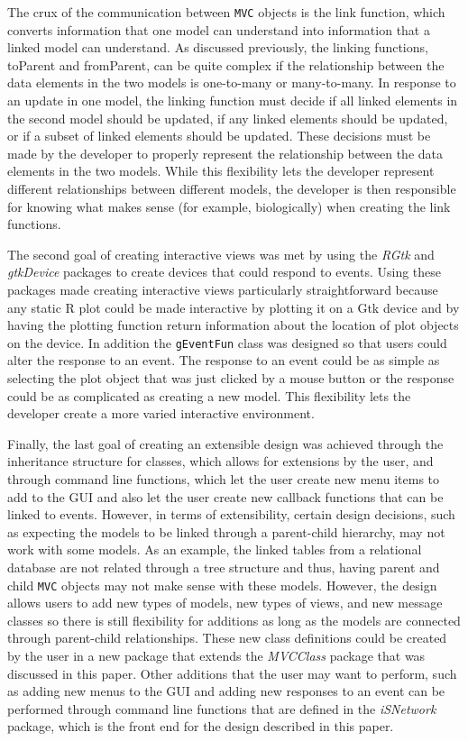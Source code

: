 \documentclass{article}[11pt]
\newcommand{\Rfunction}[1]{{\textsf{#1}}}
\newcommand{\Robject}[1]{{\texttt{#1}}}
\newcommand{\Rpackage}[1]{{\textit{#1}}}
\newcommand{\Rclass}[1]{\texttt{#1}}
\begin{document}
The crux of the communication between \Robject{MVC} objects is the link
function, which converts information that one model can understand into
information that a linked model can understand.  As discussed previously, the
linking functions, \Rfunction{toParent} and \Rfunction{fromParent}, can be
quite complex if the relationship between the data elements in the two models
is one-to-many or many-to-many.  In response to an update in one model, the
linking function must decide if all linked elements in the second model
should be updated, if any linked elements should be updated, or if a subset of
linked elements should be updated.  These decisions must be made by the
developer to properly represent the relationship between the data elements in
the two models.  While this flexibility lets the developer represent different
relationships between different models, the developer is then responsible for
knowing what makes sense (for example, biologically) when creating the link
functions. 

The second goal of creating interactive views was met by using the
\Rpackage{RGtk} and \Rpackage{gtkDevice} packages to create devices that could
respond to events.  Using these packages made creating interactive views
particularly straightforward because any static R plot could be made
interactive by plotting it on a Gtk device and by having the plotting function
return information about the location of plot objects on the device.  In
addition the \Rclass{gEventFun} class was designed so that users could alter
the response to an event.  The response to an event could be as simple as
selecting the plot object that was just clicked by a mouse button or the
response could be as complicated as creating a new model.  This flexibility
lets the developer create a more varied interactive environment.

Finally, the last goal of creating an extensible design was achieved through
the inheritance structure for classes, which allows for extensions by the
user, and through command line functions, which let the user create new menu
items to add to the GUI and also let the user create new callback functions
that can be linked to events.  However, in terms of extensibility, certain
design decisions, such as expecting the models to be linked through a
parent-child hierarchy, may not work with some models.  As an example, the
linked tables from a relational database are not related through a tree
structure and thus, having parent and child \Robject{MVC} objects may not make
sense with these models.  However, the design allows users to add new types
of models, new types of views, and new message classes so there is still
flexibility for additions as long as the models are connected through
parent-child relationships.  These new class definitions could be created by
the user in a new package that extends the \Rpackage{MVCClass} package that
was discussed in this paper.  Other additions that the user may want to
perform, such as adding new menus to the GUI and adding new responses to an
event can be performed through command line functions that are defined in the
\Rpackage{iSNetwork} package, which is the front end for the design
described in this paper. 
\end{document}
